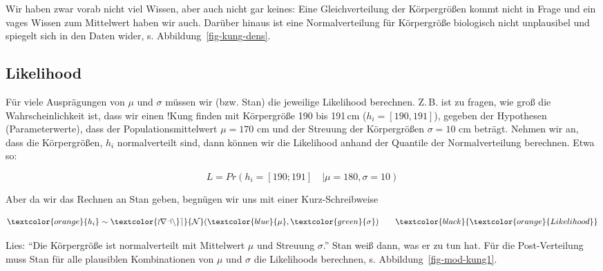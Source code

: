\documentclass[
  ngerman,
  letterpaper,
  twoside,
  open=any]{scrbook}
\theoremstyle{definition}
\theoremstyle{plain}
\theoremstyle{definition}
\theoremstyle{definition}
\theoremstyle{definition}
\theoremstyle{definition}
\theoremstyle{remark}
\begin{document}
\begin{tcolorbox}[enhanced jigsaw, arc=.35mm, bottomrule=.15mm, bottomtitle=1mm, breakable, colback=white, colbacktitle=quarto-callout-note-color!10!white, colframe=quarto-callout-note-color-frame, coltitle=black, left=2mm, leftrule=.75mm, opacityback=0, opacitybacktitle=0.6, rightrule=.15mm, title=\textcolor{quarto-callout-note-color}{\faInfo}\hspace{0.5em}{Hinweis}, titlerule=0mm, toprule=.15mm, toptitle=1mm]

Wir haben zwar vorab nicht viel Wissen, aber auch nicht gar keines: Eine
Gleichverteilung der Körpergrößen kommt nicht in Frage und ein vages
Wissen zum Mittelwert haben wir auch. Darüber hinaus ist eine
Normalverteilung für Körpergröße biologisch nicht unplausibel und
spiegelt sich in den Daten wider, s. Abbildung~\ref{fig-kung-dens}.

\end{tcolorbox}

\subsection{Likelihood}\label{likelihood-1}

Für viele Ausprägungen von \(\mu\) und \(\sigma\) müssen wir (bzw. Stan)
die jeweilige Likelihood berechnen. Z.\,B. ist zu fragen, wie groß die
Wahrscheinlichkeit ist, dass wir einen !Kung finden mit Körpergröße 190
bis 191\,cm (\(h_i = [190,191]\)), gegeben der Hypothesen
(Parameterwerte), dass der Populationsmittelwert \(\mu=170\) cm und der
Streuung der Körpergrößen \(\sigma = 10\) cm beträgt. Nehmen wir an,
dass die Körpergrößen, \(h_i\) normalverteilt sind, dann können wir die
Likelihood anhand der Quantile der Normalverteilung berechnen. Etwa so:

\[L = Pr(h_i = [190;191]\quad |\mu=180, \sigma=10)\]

Aber da wir das Rechnen an Stan geben, begnügen wir uns mit einer
Kurz-Schreibweise

\[\textcolor{orange}{h_i} \sim \mathcal{\textcolor{orange}{N}}(\textcolor{blue}{\mu}, \textcolor{green}{\sigma})
\qquad
\textcolor{black}{\textcolor{orange}{Likelihood}}\]

Lies: \enquote{Die Körpergröße ist normalverteilt mit Mittelwert \(\mu\)
und Streuung \(\sigma\).} Stan weiß dann, was er zu tun hat. Für die
Post-Verteilung muss Stan für alle plausiblen Kombinationen von \(\mu\)
und \(\sigma\) die Likelihoods berechnen, s.
Abbildung~\ref{fig-mod-kung1}.
\end{document}
